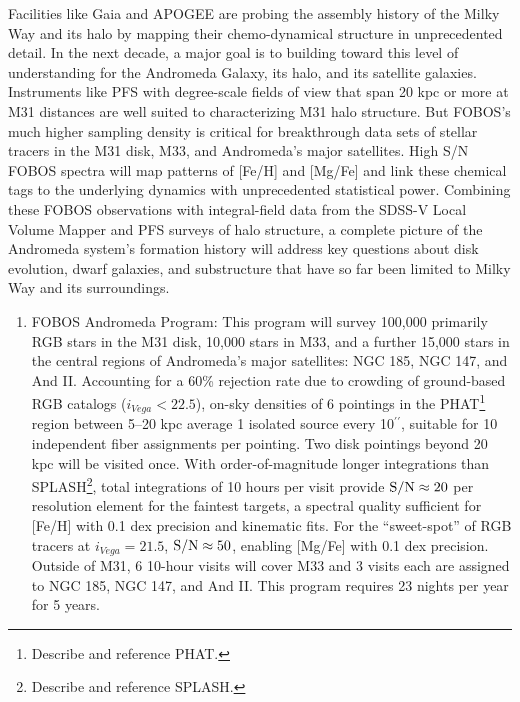 \documentclass[oneside,11pt]{amsart}
\newcommand{\arcsec}{\mbox{$^{\prime\prime}$}}
\newcounter{chalno}
\newcommand{\chal}[1]{\refstepcounter{chalno}\label{#1}}
\begin{document}
Facilities like Gaia and APOGEE are probing the assembly history of the Milky Way and its halo by mapping their
chemo-dynamical structure in unprecedented detail.  In the next decade, a major goal is to building toward this level
of understanding for the Andromeda Galaxy, its halo, and its satellite galaxies.  Instruments like PFS with
degree-scale fields of view that span 20 kpc or more at M31 distances are well suited to characterizing M31 halo
structure.  But FOBOS's much higher sampling density is critical for breakthrough data sets of stellar tracers in the
M31 disk, M33, and Andromeda's major satellites.  High S/N FOBOS spectra will map patterns of [Fe/H] and [Mg/Fe] and
link these chemical tags to the underlying dynamics with unprecedented statistical power.  Combining these FOBOS
observations with integral-field data from the SDSS-V Local Volume Mapper and PFS surveys of halo structure, a complete
picture of the Andromeda system's formation history will address key questions about disk evolution, dwarf galaxies,
and substructure that have so far been limited to Milky Way and its surroundings.




\begin{enumerate}[rightmargin=0.2cm,leftmargin=0.2cm]

\chal{stellar} 
%
\item[] {\textsf {\large FOBOS Andromeda Program:}} This program will survey 100,000 primarily RGB stars in the M31 disk, 10,000 stars in M33, and a further 15,000 stars in the central regions of Andromeda's major satellites: NGC 185, NGC 147, and And II.  Accounting for a 60\% rejection rate \citep[see][]{dorman12} due to crowding of ground-based RGB catalogs ($i_{Vega} < 22.5$), on-sky densities of 6 pointings in the PHAT\footnote{Describe and reference PHAT.} region between 5--20 kpc average 1 isolated source every 10\arcsec{}, suitable for 10 independent fiber assignments per pointing.  Two disk pointings beyond 20 kpc will be visited once.  With order-of-magnitude longer integrations than SPLASH\footnote{Describe and reference SPLASH.}, total integrations of 10 hours per visit provide ${\rm S/N} \approx 20$ per resolution element for the faintest targets, a spectral quality sufficient for [Fe/H] with 0.1 dex precision and kinematic fits.  For the ``sweet-spot'' of RGB tracers at $i_{Vega} = 21.5$, ${\rm S/N} \approx 50$, enabling [Mg/Fe] with 0.1 dex precision.  Outside of M31, 6 10-hour visits will cover M33 and 3 visits each are assigned to NGC 185, NGC 147, and And II.  This program requires 23 nights per year for 5 years.  




\end{enumerate}
\end{document}
